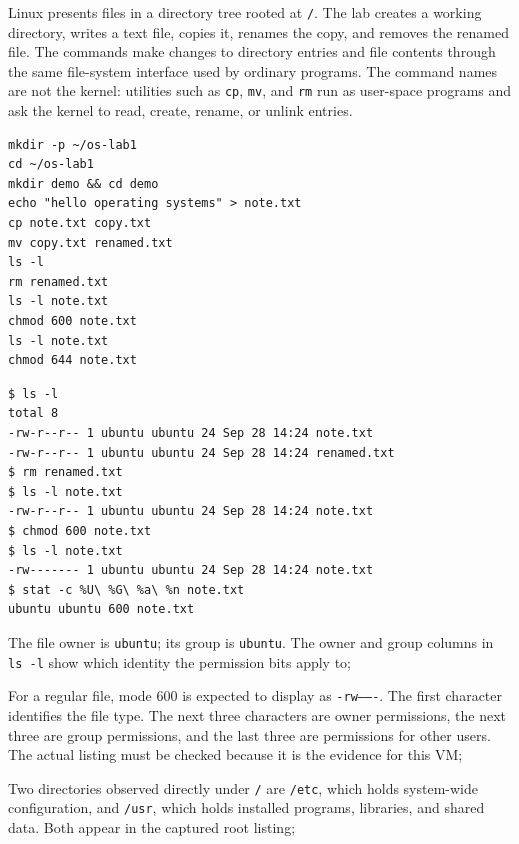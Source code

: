 \documentclass{assets/utmreport}
\begin{document}
Linux presents files in a directory tree rooted at \texttt{/}. The lab creates a working directory, writes a text file, copies it, renames the copy, and removes the renamed file. The commands make changes to directory entries and file contents through the same file-system interface used by ordinary programs. The command names are not the kernel: utilities such as \texttt{cp}, \texttt{mv}, and \texttt{rm} run as user-space programs and ask the kernel to read, create, rename, or unlink entries.

\noindent\begin{minipage}{\linewidth}
\begin{lstlisting}[caption={File operations and permission inspection}]
mkdir -p ~/os-lab1
cd ~/os-lab1
mkdir demo && cd demo
echo "hello operating systems" > note.txt
cp note.txt copy.txt
mv copy.txt renamed.txt
ls -l
rm renamed.txt
ls -l note.txt
chmod 600 note.txt
ls -l note.txt
chmod 644 note.txt
\end{lstlisting}
\end{minipage}\par


\noindent\begin{minipage}{\linewidth}
\begin{lstlisting}[caption={Selected output showing file owner, group, and mode}]
$ ls -l
total 8
-rw-r--r-- 1 ubuntu ubuntu 24 Sep 28 14:24 note.txt
-rw-r--r-- 1 ubuntu ubuntu 24 Sep 28 14:24 renamed.txt
$ rm renamed.txt
$ ls -l note.txt
-rw-r--r-- 1 ubuntu ubuntu 24 Sep 28 14:24 note.txt
$ chmod 600 note.txt
$ ls -l note.txt
-rw------- 1 ubuntu ubuntu 24 Sep 28 14:24 note.txt
$ stat -c %U\ %G\ %a\ %n note.txt
ubuntu ubuntu 600 note.txt
\end{lstlisting}
\end{minipage}\par


\begin{utmenumerate}
\item The file owner is \texttt{ubuntu}; its group is \texttt{ubuntu}. The owner and group columns in \texttt{ls -l} show which identity the permission bits apply to;
\item For a regular file, mode 600 is expected to display as \texttt{-rw-------}. The first character identifies the file type. The next three characters are owner permissions, the next three are group permissions, and the last three are permissions for other users. The actual listing must be checked because it is the evidence for this VM;
\item Two directories observed directly under \texttt{/} are \texttt{/etc}, which holds system-wide configuration, and \texttt{/usr}, which holds installed programs, libraries, and shared data. Both appear in the captured root listing;
\end{utmenumerate}
\end{document}
